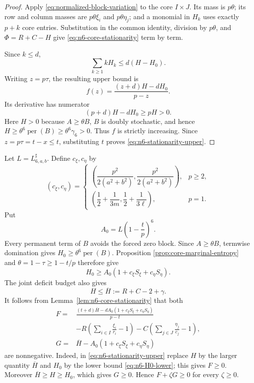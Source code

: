 \documentclass[11pt,a4paper]{article}
\numberwithin{equation}{section}
\theoremstyle{definition}
\newcommand{\per}{\operatorname{per}}
\newcommand{\1}{\mathbf{1}}
\begin{document}
\begin{proof}
Apply \eqref{eq:normalized-block-variation} to the core $I\times J$.  Its
mass is $p\theta$; its row and column masses are $p\theta\xi_i$ and
$p\theta\eta_j$; and a monomial in $H_k$ uses exactly $p+k$ core entries.
Substitution in the common identity, division by $p\theta$, and
$\Phi=R+C-H$ give \eqref{eq:n6-core-stationarity} term by term.

Since $k\le d$,
\[
 \sum_{k\ge1}kH_k\le d(H-H_0).
\]
Writing $z=p\tau$, the resulting upper bound is
\[
 f(z)=\frac{(z+d)H-dH_0}{p-z}.
\]
Its derivative has numerator
\[
 (p+d)H-dH_0\ge pH>0.
\]
Here $H>0$ because $A\ge\theta B$, $B$ is doubly stochastic, and hence
$H\ge\theta^6\per(B)\ge\theta^6\gamma_6>0$.  Thus $f$ is strictly
increasing.  Since $z=p\tau=t-x\le t$, substituting $t$ proves
\eqref{eq:n6-stationarity-upper}.
\end{proof}

Let $L=L^{\sharp}_{6,a,b}$.  Define $c_\xi,c_\eta$ by
\begin{equation}\label{eq:n6-entropy-coefficients}
 (c_\xi,c_\eta)=
 \begin{cases}
 \left(\dfrac{p^2}{2(a^2+b^2)},
       \dfrac{p^2}{2(a^2+b^2)}\right),&p\ge2,\\[3mm]
 \left(\dfrac12+\dfrac1{3m},
       \dfrac12+\dfrac1{3\ell}\right),&p=1.
 \end{cases}
\end{equation}
Put
\begin{equation}\label{eq:n6-A0}
 A_0=L\left(1-\frac tp\right)^6.
\end{equation}
Every permanent term of $B$ avoids the forced zero block.  Since
$A\ge\theta B$, termwise domination gives
$H_0\ge\theta^6\per(B)$.  Proposition
\ref{prop:core-marginal-entropy} and
$\theta=1-\tau\ge1-t/p$ therefore give
\begin{equation}\label{eq:n6-H0-lower}
 H_0\ge A_0(1+c_\xi S_\xi+c_\eta S_\eta).
\end{equation}
The joint deficit budget also gives
\begin{equation}\label{eq:n6-Hbar}
 H\le\overline H:=R+C-2+\gamma.
\end{equation}
It follows from Lemma~\ref{lem:n6-core-stationarity} that both
\begin{align}
 F={}&
 \frac{(t+d)\overline H-dA_0(1+c_\xi S_\xi+c_\eta S_\eta)}{p-t}
 \nonumber\\[-1mm]
 &-R\left(\sum_{i\in I}\frac{\xi_i}{r_i}-1\right)
 -C\left(\sum_{j\in J}\frac{\eta_j}{c_j}-1\right),\label{eq:n6-F}\\
 G={}&\overline H-A_0(1+c_\xi S_\xi+c_\eta S_\eta)\label{eq:n6-G}
\end{align}
are nonnegative.  Indeed, in \eqref{eq:n6-stationarity-upper} replace
$H$ by the larger quantity $\overline H$ and $H_0$ by the lower bound
\eqref{eq:n6-H0-lower}; this gives $F\ge0$.  Moreover
$\overline H\ge H\ge H_0$, which gives $G\ge0$.  Hence
$F+\zeta G\ge0$ for every $\zeta\ge0$.
\end{document}
